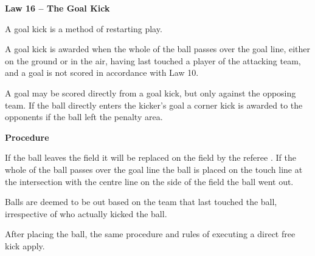 \clearpage
\sffamily
{\bfseries
\textcolor[rgb]{0.4,0.4,0.4}{Law 16 -- The Goal Kick} }
{}


\bigskip

A goal kick is a method of restarting play.

\bigskip

A goal kick is awarded when the whole of the ball passes over the goal line, either on the ground or in the air, having last touched a player of the attacking team, and a goal is not scored in accordance with Law
10.

\bigskip

A goal may be scored directly from a goal kick, but only against the opposing team.
If the ball directly enters the kicker's goal a corner kick is awarded to the
opponents if the ball left the penalty area.

\bigskip

\bigskip

{\bfseries Procedure}

\headlinebox

If the ball leaves the field it will be replaced on the field by the referee .
If the whole of the ball passes over the goal line the ball is placed on the
touch line at the intersection with the centre line on the side of the field
the ball went out.

\bigskip

Balls are deemed to be out based on the team that last touched the ball, irrespective of who actually kicked the ball. 

\bigskip

After placing the ball, the same procedure and rules of executing a direct free kick apply.

\bigskip


